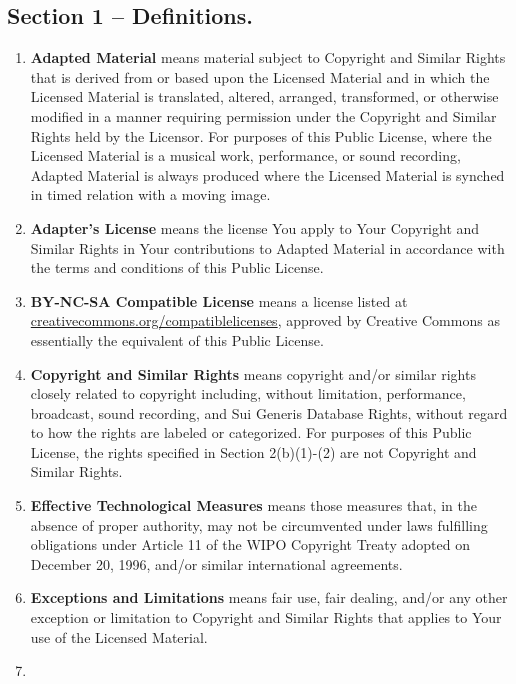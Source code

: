 \documentclass[]{book}
\begin{document}
\subsection{Section 1 -- Definitions.}\label{section-1-definitions.}

\begin{enumerate}
\def\labelenumi{\alph{enumi}.}
\item
  \textbf{Adapted Material} means material subject to Copyright and
  Similar Rights that is derived from or based upon the Licensed
  Material and in which the Licensed Material is translated, altered,
  arranged, transformed, or otherwise modified in a manner requiring
  permission under the Copyright and Similar Rights held by the
  Licensor. For purposes of this Public License, where the Licensed
  Material is a musical work, performance, or sound recording, Adapted
  Material is always produced where the Licensed Material is synched in
  timed relation with a moving image.
\item
  \textbf{Adapter's License} means the license You apply to Your
  Copyright and Similar Rights in Your contributions to Adapted Material
  in accordance with the terms and conditions of this Public License.
\item
  \textbf{BY-NC-SA Compatible License} means a license listed at
  \href{http://creativecommons.org/compatiblelicenses}{creativecommons.org/compatiblelicenses},
  approved by Creative Commons as essentially the equivalent of this
  Public License.
\item
  \textbf{Copyright and Similar Rights} means copyright and/or similar
  rights closely related to copyright including, without limitation,
  performance, broadcast, sound recording, and Sui Generis Database
  Rights, without regard to how the rights are labeled or categorized.
  For purposes of this Public License, the rights specified in Section
  2(b)(1)-(2) are not Copyright and Similar Rights.
\item
  \textbf{Effective Technological Measures} means those measures that,
  in the absence of proper authority, may not be circumvented under laws
  fulfilling obligations under Article 11 of the WIPO Copyright Treaty
  adopted on December 20, 1996, and/or similar international agreements.
\item
  \textbf{Exceptions and Limitations} means fair use, fair dealing,
  and/or any other exception or limitation to Copyright and Similar
  Rights that applies to Your use of the Licensed Material.
\item

\end{enumerate}
\end{document}
